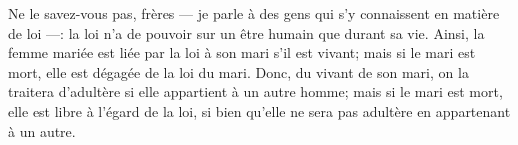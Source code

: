 Ne le savez-vous pas, frères
	--- je parle à des gens qui s’y connaissent en matière de loi ---:
	la loi n’a de pouvoir sur un être humain que durant sa vie.
Ainsi, la femme mariée est liée par la loi à son mari s’il est vivant;
	mais si le mari est mort, elle est dégagée de la loi du mari.
Donc, du vivant de son mari,
		on la traitera d’adultère si elle appartient à un autre homme;
	mais si le mari est mort, elle est libre à l’égard de la loi,
	si bien qu’elle ne sera pas adultère en appartenant à un autre.
